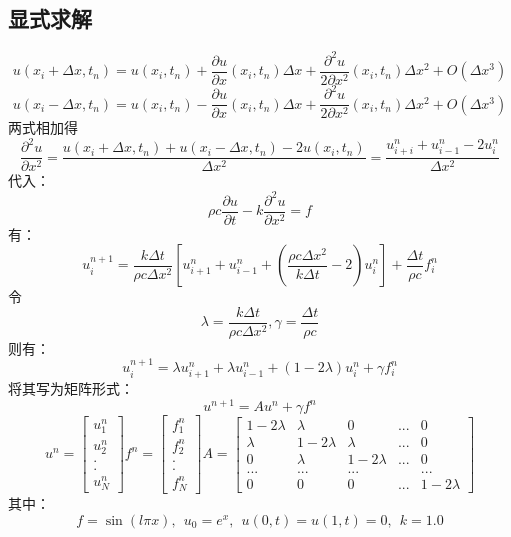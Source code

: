\documentclass[10pt, a4paper]{article}
\begin{document}
\subsection{显式求解}
$$u(x_i+\Delta x,t_n)=u(x_i,t_n)+\frac{\partial u}{\partial x}(x_i,t_n)\Delta x+\frac{\partial^2 u}{2\partial x^2}(x_i,t_n)\Delta x^2+O(\Delta x^3) $$
$$u(x_i-\Delta x,t_n)=u(x_i,t_n)-\frac{\partial u}{\partial x}(x_i,t_n)\Delta x+\frac{\partial^2 u}{2\partial x^2}(x_i,t_n)\Delta x^2+O(\Delta x^3)$$
两式相加得
$$\frac{\partial ^2u}{\partial x^2}=\frac{u(x_i+\Delta x,t_n)+u(x_i-\Delta x,t_n)-2u(x_i,t_n)}{\Delta x^2}=\frac{u_{i+i}^{n}+u_{i-1}^{n}-2u_{i}^{n}}{\Delta x^2}$$
代入：
$$\rho c\frac{\partial u}{\partial t}-k\frac{\partial ^2u}{\partial x^2}=f$$
有：
$$u_i^{n+1}=\frac{k\Delta t}{\rho c\Delta x^2}\left [
u^n_{i+1}+u^n_{i-1}+(\frac{\rho c\Delta x^2}{k\Delta t}-2)u_i^n
\right]+\frac{\Delta t}{\rho c}f^n_i$$
令
$$\lambda=\frac{k\Delta t}{\rho c\Delta x^2},\gamma=\frac{\Delta t}{\rho c}$$
则有：
$$u_i^{n+1}=
\lambda u^n_{i+1}+\lambda u^n_{i-1}+({1}-2\lambda)u_i^n
+\gamma f^n_i$$
将其写为矩阵形式：
$$u^{n+1}=Au^{n}+\gamma f^n$$
$$u^n=\begin{bmatrix}
u_1^n\\u^n_2\\.\\.\\u^n_N
\end{bmatrix}
f^n=\begin{bmatrix}
f_1^n\\f^n_2\\.\\.\\f^n_N
\end{bmatrix}
A=\begin{bmatrix}
1-2\lambda&\lambda&0&...&0\\
\lambda&1-2\lambda&\lambda&...&0\\
0&\lambda&1-2\lambda&...&0\\
...&...&...&&...\\
0&0&0&...&1-2\lambda
\end{bmatrix}$$
其中：
$$f=\sin(l\pi x),~~u_0=e^x,~~u(0,t)=u(1,t)=0,~~k=1.0$$
\end{document}
